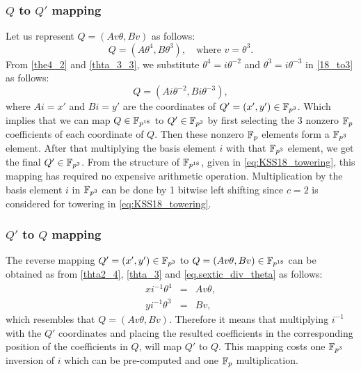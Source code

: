 \subsubsection{$Q$ to $Q'$ mapping}
Let us represent $Q = (Av\theta, Bv)$  as follows:
\begin{equation}\label{18_to3}
Q  =  (A\theta^4, B\theta^3), \quad \text{where $v=\theta^3$}.
\end{equation}
From \eqref{the4_2} and \eqref{thta_3_3}, we substitute $ \theta^4 = i\theta^{-2}$ and $\theta^3 = i\theta^{-3}$  in \eqref{18_to3}  as 
follows:
\begin{equation}\label{18_to3.1}
Q  =  (Ai\theta^{-2}, Bi\theta^{-3}),
\end{equation}
where $Ai = x'$ and $Bi = y'$ are the coordinates of $Q' =(x',y') \in \mathbb{F}_{p^3}$. Which implies that we can map $Q \in \mathbb{F}_{p^{18}}$ to $Q' \in \mathbb{F}_{p^3}$ by first selecting the $3$ nonzero ${\mathbb{F}}_{p}$ coefficients of each coordinate of $Q$. Then these nonzero ${\mathbb{F}}_{p}$ elements form a $\mathbb{F}_{p^3}$ element. After that multiplying the basis element $i$ with that $\mathbb{F}_{p^3}$ element, we get the final $Q' \in \mathbb{F}_{p^3}$. From the structure of $\mathbb{F}_{p^{18}}$, given in \eqref{eq:KSS18_towering}, this mapping has required no expensive arithmetic operation.  Multiplication by the basis element $i$ in $\mathbb{F}_{p^3}$ can be done by 1 bitwise left shifting since $c=2$ is considered for towering in \eqref{eq:KSS18_towering}.

\subsubsection{$Q'$ to $Q$ mapping}
 The reverse mapping $Q' =(x',y') \in \mathbb{F}_{p^3}$ to $Q =(Av\theta,Bv) \in \mathbb{F}_{p^{18}}$ can be obtained as from \eqref{thta2_4}, \eqref{thta_3} and \eqref{eq.sextic_div_theta} as follows:
 \begin{subequations}
 \begin{eqnarray}
 x i^{-1}\theta^{4} & = & Av\theta, \nonumber \\
 y i^{-1}\theta^{3} & = & Bv, \nonumber
 \end{eqnarray}
 \end{subequations}
  which resembles that $Q= (Av\theta, Bv)$. Therefore it means that multiplying $i^{-1}$ with the $Q'$ coordinates and placing the resulted coefficients in the corresponding position of the coefficients in $Q$, will map $Q'$ to $Q$.
This mapping costs one $\mathbb{F}_{p^3}$ inversion of $i$ which can be pre-computed and one ${\mathbb{F}}_{p}$ multiplication.

